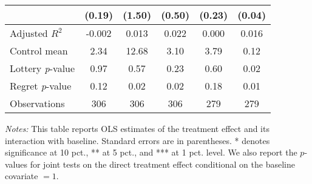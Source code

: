 \begin{table}[htbp]
{\begin{threeparttable}
\begin{tabular}{l*{5}{c}}
                &   (0.19)         &   (1.50)         &   (0.50)         &   (0.23)         &   (0.04)         \\
\midrule
Adjusted \(R^{2}\)&   -0.002         &    0.013         &    0.022         &    0.000         &    0.016         \\
Control mean    &     2.34         &    12.68         &     3.10         &     3.79         &     0.12         \\
Lottery \emph{p}-value&     0.97         &     0.57         &     0.23         &     0.60         &     0.02         \\
Regret \emph{p}-value&     0.12         &     0.02         &     0.02         &     0.18         &     0.01         \\
Observations    &      306         &      306         &      306         &      279         &      279         \\
\bottomrule \end{tabular} \begin{tablenotes}[flushleft] \footnotesize \item \emph{Notes:} This table reports OLS estimates of the treatment effect and its interaction with baseline. Standard errors are in parentheses. * denotes significance at 10 pct., ** at 5 pct., and *** at 1 pct. level. We also report the \(p\)-values for joint tests on the direct treatment effect conditional on the baseline covariate $= 1$. \end{tablenotes} \end{threeparttable} } \end{table}
